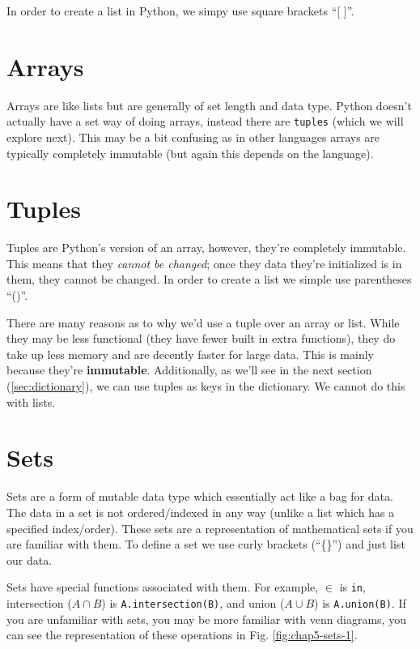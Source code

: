 \documentclass[12pt,a4paper]{book}
\newcommand{\figref}[1]{Fig. \ref{#1}}
\begin{document}
			In order to create a list in Python, we simpy use square brackets ``[ ]''.
  			 
		\section{Arrays}
			Arrays are like lists but are generally of set length and data type. Python doesn't actually have a set way of doing arrays, instead there are \texttt{tuples} (which we will explore next). This may be a bit confusing as in other languages arrays are typically completely immutable (but again this depends on the language).
		
		\section{Tuples}
			Tuples are Python's version of an array, however, they're completely immutable. This means that they \textit{cannot be changed}; once they data they're initialized is in them, they cannot be changed. In order to create a list we simple use parentheses ``()''. 
			
			
			
			There are many reasons as to why we'd use a tuple over an array or list. While they may be less functional (they have fewer built in extra functions), they do take up less memory and are decently faster for large data. This is mainly because they're \textbf{immutable}. Additionally, as we'll see in the next section (\ref{sec:dictionary}), we can use tuples as keys in the dictionary. We cannot do this with lists.

		\section{Sets}
			Sets are a form of mutable data type which essentially act like a bag for data. The data in a set is not ordered/indexed in any way (unlike a list which has a specified index/order). These sets are a representation of mathematical sets if you are familiar with them. To define a set we use curly brackets (``\{\}'') and just list our data.
			

			Sets have special functions associated with them. For example, $\in$ is \texttt{in}, intersection ($A\cap B$) is \texttt{A.intersection(B)}, and union ($A\cup B$) is \texttt{A.union(B)}. If you are unfamiliar with sets, you may be more familiar with venn diagrams, you can see the representation of these operations in \figref{fig:chap5-sets-1}.
\end{document}
